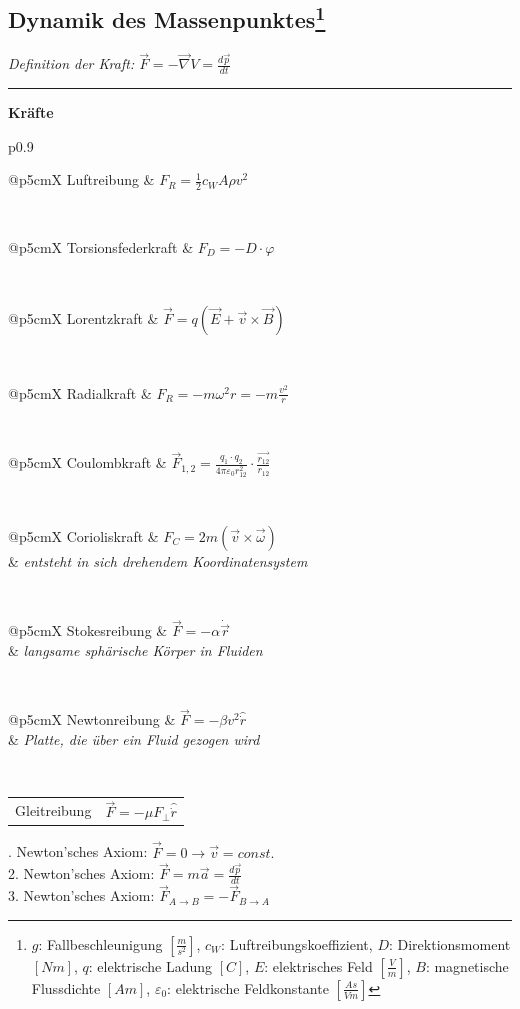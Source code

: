 \documentclass[12pt,a4paper, twoside]{article}
\makeatletter
\renewcommand{\d}[2]{\frac{d #1}{d #2}}
\renewcommand{\=}[1]{\stackrel{#1}{=}}
\theoremstyle{definition}
\theoremstyle{remark}
\newcommand{\notes}[1]{%
\textit{#1}\\
\hrule
}
\newcommand{\concept}[2]{%
\noindent
\begin{framed}
\noindent\textbf{#1}
\par\begin{tabular}{p{0.9\linewidth}}
#2
\end{tabular}
\end{framed}
}
\newcommand{\fnote}[3]{%
\noindent\begin{tabularx}{\linewidth}{@{}p{5cm}X}
#1 & $#2$\\
& \textit{\small{#3}}
\end{tabularx}}
\newcommand{\f}[2]{%
\noindent\begin{tabularx}{\linewidth}{@{}p{5cm}X}
#1 & $#2$
\end{tabularx}}
\makeatother
\begin{document}
\newpage
\subsection[Dynamik des Massenpunktes]{Dynamik des Massenpunktes\let\thefootnote\relax\footnote{$g$: Fallbeschleunigung $[\frac{m}{s^2}]$, $c_W$: Luftreibungskoeffizient, $D$: Direktionsmoment $[Nm]$, $q$: elektrische Ladung $[C]$, $E$: elektrisches Feld $[\frac{V}{m}]$, $B$: magnetische Flussdichte $[Am]$, $\varepsilon_0$: elektrische Feldkonstante $[\frac{As}{Vm}]$}}

\notes{Definition der Kraft: $\vec{F} = -\vec{\nabla}V = \d{\vec p}{t}$}

\concept{Kräfte}{
\f{Luftreibung}{F_R = \frac{1}{2} c_W A \rho v^2}\\

\f{Torsionsfederkraft}{F_D = -D \cdot \varphi}\\

\f{Lorentzkraft}{\vec{F} = q(\vec{E} + \vec{v} \times \vec{B})}\\

\f{Radialkraft}{F_R = -m \omega^2 r = -m \frac{v^2}{r}}\\

\f{Coulombkraft}{\vec{F}_{1,2} = \frac{q_1 \cdot q_2}{4 \pi \varepsilon_0 r_{12}^2} \cdot \frac{\vec{r_{12}}}{r_{12}}}\\

\fnote{Corioliskraft}{F_C = 2m(\vec{v} \times \vec{\omega})}{entsteht in sich drehendem Koordinatensystem}\\

\fnote{Stokesreibung}{\vec{F} = - \alpha \dot{\vec{r}}}{langsame sphärische Körper in Fluiden}\\

\fnote{Newtonreibung}{\vec{F} = -\beta v^2 \hat{\dot{r}}}{Platte, die über ein Fluid gezogen wird}\\

\f{Gleitreibung}{\vec{F} = -\mu F_{\perp} \hat{\dot{r}}}
}

\begin{center}
\begin{framed}
. Newton'sches Axiom: $\vec F = 0 \rightarrow \vec v = const.$\\
2. Newton'sches Axiom: $\vec{F} = m\vec{a} = \frac{d\vec{p}}{dt}$\\
3. Newton'sches Axiom: $\vec F_{A \rightarrow B} = - \vec F_{B \rightarrow A}$
\end{framed}
\end{center}
\end{document}
